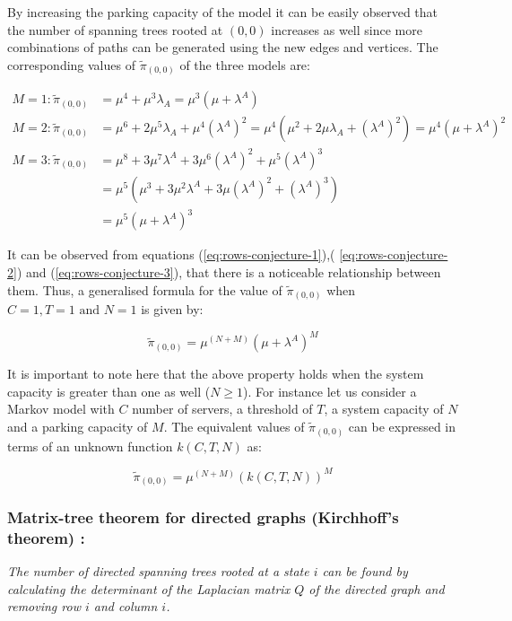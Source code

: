 By increasing the parking capacity of the model it can be easily observed that the number of spanning trees rooted at \((0,0)\) increases as well since more combinations of paths can be generated using the new edges and vertices. The corresponding values of \(\tilde{\pi}_{(0,0)}\) of the three models are:

\begin{align}
    M = 1: \tilde{\pi}_{(0,0)} &= \mu^4 + \mu^3 \lambda_A = \mu^3 (\mu + \lambda^A) \label{eq:rows-conjecture-1}\\
    M = 2: \tilde{\pi}_{(0,0)} &= \mu^6 + 2\mu^5 \lambda_A + \mu^4 (\lambda^A)^2 = \mu^4(\mu^2 + 2\mu \lambda_A + (\lambda^A)^2) = \mu^4 (\mu + \lambda^A) ^ 2 \label{eq:rows-conjecture-2}\\
    M = 3: \tilde{\pi}_{(0,0)} &= \mu^8 + 3 \mu^7 \lambda^A + 3 \mu^6 (\lambda^A)^2 + \mu^5(\lambda^A)^3 \nonumber \\
    &= \mu^5 (\mu^3 + 3 \mu ^2 \lambda^A + 3 \mu (\lambda^A)^2 + (\lambda^A)^3) \nonumber \\
    &= \mu^5 (\mu + \lambda^A) ^ 3 \label{eq:rows-conjecture-3}
\end{align}

It can be observed from equations (\ref{eq:rows-conjecture-1}),( \ref{eq:rows-conjecture-2}) and (\ref{eq:rows-conjecture-3}), that there is a noticeable relationship between them. 
Thus, a generalised formula for the value of \(\tilde{\pi}_{(0,0)}\) when \(C=1, T=1 \text{ and } N=1\) is given by:

\begin{equation}\label{eq:rows-conjecture-general}
    \tilde{\pi}_{(0,0)} = \mu^{(N+M)} (\mu + \lambda^A)^M
\end{equation}

It is important to note here that the above property holds when the system capacity is greater than one as well (\(N \geq 1\)). 
For instance let us consider a Markov model with \(C\) number of servers, a threshold of \(T\), a system capacity of \(N\) and a parking capacity of \(M\). 
The equivalent values of \(\tilde{\pi}_{(0,0)}\) can be expressed in terms of an unknown function \(k(C,T,N)\) as:

\begin{equation}
    \tilde{\pi}_{(0,0)} = \mu^{(N+M)} (k(C,T,N))^M
\end{equation}


\subsubsection{Matrix-tree theorem for directed graphs (Kirchhoff's theorem) \cite{matrix-tree-theorem}: }
\textit{The number of directed spanning trees rooted at a state \(i\) can be found by calculating the determinant of the Laplacian matrix \(Q\) of the directed graph and removing row \(i\) and column \(i\).}


